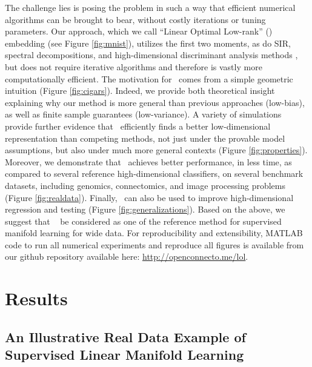 \documentclass[10pt]{article}
\begin{document}
The challenge lies is posing the problem in such a way that efficient numerical algorithms can be brought to bear, without costly iterations or tuning parameters.  Our approach, which we call ``Linear Optimal Low-rank'' (\Lol) embedding (see Figure \ref{fig:mnist}), utilizes the first two moments, as do SIR, spectral decompositions, and high-dimensional discriminant analysis methods \cite{Bouveyron07a}, but does not require iterative algorithms and therefore is vastly more computationally efficient.  The motivation for \Lol~comes from a simple geometric intuition (Figure \ref{fig:cigars}).  Indeed, we provide both theoretical insight explaining why our method is more general than previous approaches (low-bias), as well as finite sample guarantees (low-variance).  A variety of simulations provide further evidence that \Lol~efficiently finds a better low-dimensional representation than competing methods, not just under the provable model assumptions, but also under much more general contexts (Figure \ref{fig:properties}).  Moreover, we demonstrate that \Lol~achieves better performance, in less time, as compared to several reference high-dimensional classifiers, on several benchmark datasets, including genomics, connectomics, and image processing problems (Figure \ref{fig:realdata}). 
Finally, \Lol~can also be used to improve high-dimensional regression and testing (Figure \ref{fig:generalizations}).  
Based on the above, we suggest that \Lol~ be considered as one of the reference method for supervised manifold learning for wide data. 
For reproducibility and extensibility, MATLAB code to run all numerical experiments and reproduce all figures is available from our github repository available here: \url{http://openconnecto.me/lol}. 


\section*{Results}

\subsection*{An Illustrative Real Data Example of Supervised Linear Manifold Learning}
\end{document}
